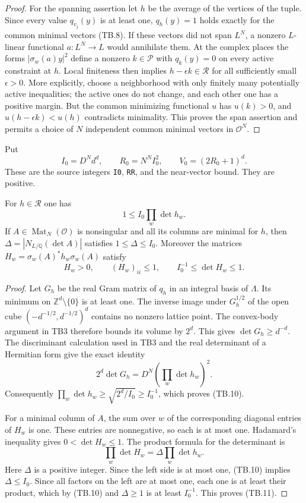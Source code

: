 \begin{proof}
For the spanning assertion let $h$ be the average of the vertices
of the tuple.  Since every value $q_{v_j}(y)$ is at least one,
$q_h(y)=1$ holds exactly for the common minimal vectors (TB.8).
If these vectors did not span $L^N$, a nonzero $L$-linear functional
$a:L^N\to L$ would annihilate them.  At the complex places the
forms $|\sigma_w(a)y|^2$ define a nonzero $k\in\mathcal P$ with
$q_k(y)=0$ on every active constraint at $h$.  Local finiteness
then implies $h-\epsilon k\in\mathcal R$ for all sufficiently
small $\epsilon>0$.  More explicitly, choose a neighborhood with
only finitely many potentially active inequalities; the active
ones do not change, and each other one has a positive margin.
But the common minimizing functional $u$ has $u(k)>0$, and
$u(h-\epsilon k)<u(h)$ contradicts minimality.  This proves the
span assertion and permits a choice of $N$ independent common
minimal vectors in $\mathcal O^N$.
\end{proof}

Put
\[
       I_0=D^N d^d,\qquad R_0=N^N I_0^2,
       \qquad V_0=(2R_0+1)^d.
       \tag{TB.9}
\]
These are the source integers \texttt{I0}, \texttt{RR}, and the
near-vector bound.  They are positive.

\begin{proposition}
\label{prop:tb-determinant}
For $h\in\mathcal R$ one has
\[
                 1\le I_0\prod_w\det h_w.
                 \tag{TB.10}
\]
If $A\in\operatorname{Mat}_N(\mathcal O)$ is nonsingular and all
its columns are minimal for $h$, then
$\Delta=|N_{L/\mathbb Q}(\det A)|$ satisfies
$1\le\Delta\le I_0$.  Moreover the matrices
$H_w=\sigma_w(A)^*h_w\sigma_w(A)$ satisfy
\[
 H_w>0,\qquad (H_w)_{ii}\le1,\qquad
                 I_0^{-1}\le\det H_w\le1.
                 \tag{TB.11}
\]
\end{proposition}

\begin{proof}
Let $G_h$ be the real Gram matrix of $q_h$ in an integral basis of
$\Lambda$.  Its minimum on $\mathbb Z^d\setminus\{0\}$ is at
least one.  The inverse image under $G_h^{1/2}$ of the open cube
$(-d^{-1/2},d^{-1/2})^d$ contains no nonzero lattice point.
The convex-body argument in TB3 therefore bounds its volume by
$2^d$.  This gives $\det G_h\ge d^{-d}$.  The discriminant
calculation used in TB3 and the real determinant of a Hermitian
form give the exact identity
\[
        2^d\det G_h=D^N\left(\prod_w\det h_w\right)^2.
        \tag{TB.12}
\]
Consequently $\prod_w\det h_w\ge\sqrt{2^d/I_0}\ge I_0^{-1}$,
which proves (TB.10).

For a minimal column of $A$, the sum over $w$ of the corresponding
diagonal entries of $H_w$ is one.  These entries are nonnegative,
so each is at most one.  Hadamard's inequality gives
$0<\det H_w\le1$.  The product formula for the determinant is
\[
       \prod_w\det H_w
           =\Delta\prod_w\det h_w.
           \tag{TB.13}
\]
Here $\Delta$ is a positive integer.  Since the left side is at
most one, (TB.10) implies $\Delta\le I_0$.  Since all factors
on the left are at most one, each one is at least their product,
which by (TB.10) and $\Delta\ge1$ is at least $I_0^{-1}$.
This proves (TB.11).
\end{proof}

